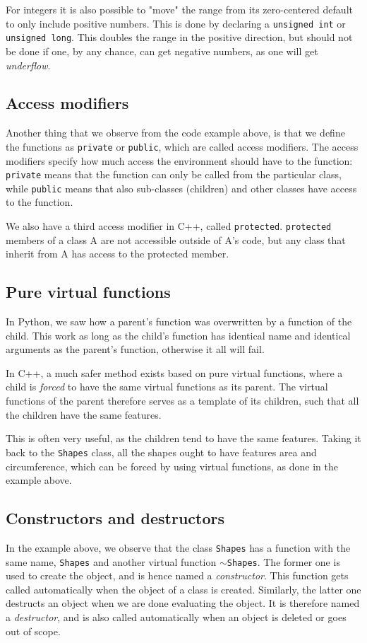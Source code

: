 For integers it is also possible to "move" the range from its zero-centered default to only include positive numbers. This is done by declaring a \texttt{unsigned int} or \texttt{unsigned long}. This doubles the range in the positive direction, but should not be done if one, by any chance, can get negative numbers, as one will get \textit{underflow}.  

\subsection{Access modifiers}
Another thing that we observe from the code example above, is that we define the functions as \texttt{private} or \texttt{public}, which are called access modifiers. The access modifiers specify how much access the environment should have to the function: \texttt{private} means that the function can only be called from the particular class, while \texttt{public} means that also sub-classes (children) and other classes have access to the function. 

We also have a third access modifier in C++, called \texttt{protected}. \texttt{protected} members of a class A are not accessible outside of A's code, but any class that inherit from A has access to the protected member. 

\subsection{Pure virtual functions}
In Python, we saw how a parent's function was overwritten by a function of the child. This work as long as the child's function has identical name and identical arguments as the parent's function, otherwise it all will fail.

In C++, a much safer method exists based on pure virtual functions, where a child is \textit{forced} to have the same virtual functions as its parent. The virtual functions of the parent therefore serves as a template of its children, such that all the children have the same features. 

This is often very useful, as the children tend to have the same features. Taking it back to the \texttt{Shapes} class, all the shapes ought to have features area and circumference, which can be forced by using virtual functions, as done in the example above. 

\subsection{Constructors and destructors}
In the example above, we observe that the class \texttt{Shapes} has a function with the same name, \texttt{Shapes} and another virtual function $\sim$\texttt{Shapes}. The former one is used to create the object, and is hence named a \textit{constructor}. This function gets called automatically when the object of a class is created. Similarly, the latter one destructs an object when we are done evaluating the object. It is therefore named a \textit{destructor}, and is also called automatically when an object is deleted or goes out of scope.

